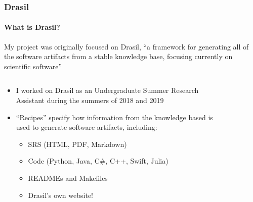 \documentclass{beamer}
\begin{document}
\begin{frame}
    \frametitle{Drasil}
    \framesubtitle{What is Drasil?}
    My project was originally focused on Drasil, ``a framework for generating
    all of the software artifacts from a stable knowledge base, focusing
    currently on scientific software'' \citep{HuntEtAl2021}
    \vspace{-2mm}
    \begin{columns}[T,onlytextwidth]
        \begin{column}{.6\textwidth}
            \vspace{2mm}
            \begin{minipage}{\textwidth}
                \begin{itemize}
                    \item<2-> I worked on Drasil as an Undergraduate Summer
                          Research Assistant during the summers of 2018 and 2019
                    \item<3-> ``Recipes'' specify how information from the
                          knowledge based is used to generate
                          software artifacts, including:
                          \begin{itemize}
                              \item SRS (HTML, PDF, Markdown)
                              \item Code (Python, Java, C\#, C++, Swift, Julia)
                              \item READMEs and Makefiles
                              \item Drasil's own website\footnotemark[1]!
                          \end{itemize}
                \end{itemize}
            \end{minipage}
        \end{column}
        \begin{column}{.35\textwidth}
            \begin{figure}

\end{figure}
\end{column}
\end{columns}
\end{frame}
\end{document}
